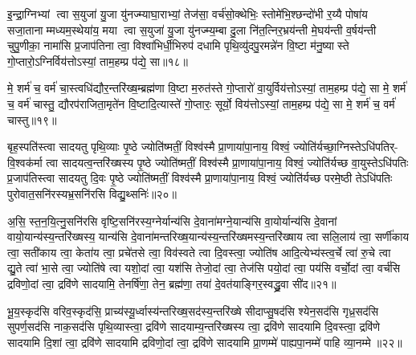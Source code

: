 {}

इ॒न्द्रा॒ग्निभ्यां त्वा स॒युजा॑ यु॒जा यु॑नज्म्याघा॒राभ्यां॒ तेज॑सा॒ वर्च॑सो॒क्थेभिः॒ स्तोमे॑भि॒श्छन्दो॑भी र॒य्यै पोषा॑य सजा॒तानाम्मध्यम॒स्थेया॑य॒ मया त्वा स॒युजा॑ यु॒जा यु॑नज्म्य॒म्बा दु॒ला नि॑त॒त्निर॒भ्रय॑न्ती मे॒घय॑न्ती व॒र्\mbox{}षय॑न्ती चुपु॒णीका॒ नामा॑सि प्र॒जाप॑तिना त्वा॒ विश्वा॑भिर्धी॒भिरुप॑ दधामि पृथि॒व्यु॑दपु॒रमन्ने॑न वि॒ष्टा म॑नु॒ष्यास्ते गो॒प्तारो॒ऽग्निर्विय॑त्तोऽस्यां॒ ताम॒हम्प्र प॑द्ये॒ सा॥१८॥

मे॒ शर्म॑ च॒ वर्म॑ चा॒स्त्वधि॑द्यौर॒न्तरि॑ख्ष॒म्ब्रह्म॑णा वि॒ष्टा म॒रुत॑स्ते गो॒प्तारो॑ वा॒युर्विय॑त्तोऽस्यां॒ ताम॒हम्प्र प॑द्ये॒ सा मे॒ शर्म॑ च॒ वर्म॑ चास्तु॒ द्यौरप॑राजिता॒मृते॑न वि॒ष्टादि॒त्यास्ते॑ गो॒प्तारः॒ सूर्यो॒ विय॑त्तोऽस्यां॒ ताम॒हम्प्र प॑द्ये॒ सा मे॒ शर्म॑ च॒ वर्म॑ चास्तु॥१९॥

{\anuvakamend[{साऽष्टाच॑त्वारिशच्च॥५॥}]}

बृह॒स्पति॑स्त्वा सादयतु पृथि॒व्याः पृ॒ष्ठे ज्योति॑ष्मतीं॒ विश्व॑स्मै प्रा॒णाया॑पा॒नाय॒ विश्वं॒ ज्योति॑र्यच्छा॒ग्निस्तेऽधि॑पतिर्- वि॒श्वक॑र्मा त्वा सादयत्व॒न्तरि॑ख्षस्य पृ॒ष्ठे ज्योति॑ष्मतीं॒ विश्व॑स्मै प्रा॒णाया॑पा॒नाय॒ विश्वं॒ ज्योति॑र्यच्छ वा॒युस्तेऽधि॑पतिः प्र॒जाप॑तिस्त्वा सादयतु दि॒वः पृ॒ष्ठे ज्योति॑ष्मतीं॒ विश्व॑स्मै प्रा॒णाया॑पा॒नाय॒ विश्वं॒ ज्योति॑र्यच्छ परमे॒ष्ठी तेऽधि॑पतिः पुरोवात॒सनि॑रस्यभ्र॒सनि॑रसि विद्यु॒थ्सनिः॑॥२०॥

अ॒सि॒ स्त॒न॒यि॒त्नु॒सनि॑रसि वृष्टि॒सनि॑रस्य॒ग्नेर्यान्य॑सि दे॒वाना॑मग्ने॒यान्य॑सि वा॒योर्यान्य॑सि दे॒वानां वायो॒यान्य॑स्य॒न्तरि॑ख्षस्य॒ यान्य॑सि दे॒वाना॑मन्तरिख्ष॒यान्य॑स्य॒न्तरि॑ख्षमस्य॒न्तरि॑ख्षाय त्वा सलि॒लाय॑ त्वा॒ सर्णी॑काय त्वा॒ सती॑काय त्वा॒ केता॑य त्वा॒ प्रचे॑तसे त्वा॒ विव॑स्वते त्वा दि॒वस्त्वा॒ ज्योति॑ष आदि॒त्येभ्य॑स्त्व॒र्चे त्वा॑ रु॒चे त्वा द्यु॒ते त्वा॑ भा॒से त्वा॒ ज्योति॑षे त्वा यशो॒दां त्वा॒ यश॑सि तेजो॒दां त्वा॒ तेज॑सि पयो॒दां त्वा॒ पय॑सि वर्चो॒दां त्वा॒ वर्च॑सि द्रविणो॒दां त्वा॒ द्रवि॑णे सादयामि॒ तेनर्\mbox{}षि॑णा॒ तेन॒ ब्रह्म॑णा॒ तया॑ दे॒वत॑याङ्गिर॒स्वद्ध्रु॒वा सी॑द॥२१॥

{\anuvakamend[{वि॒द्यु॒थ्सनि॑र्द्यु॒त्वैका॒न्नत्रि॒ꣳ॒शच्च॑॥६॥}]}

भू॒य॒स्कृद॑सि वरिव॒स्कृद॑सि॒ प्राच्य॑स्यू॒र्ध्वास्य॑न्तरिख्ष॒सद॑स्य॒न्तरि॑ख्षे सीदाप्सु॒षद॑सि श्येन॒सद॑सि गृध्र॒सद॑सि सुपर्ण॒सद॑सि नाक॒सद॑सि पृथि॒व्यास्त्वा॒ द्रवि॑णे सादयाम्य॒न्तरि॑ख्षस्य त्वा॒ द्रवि॑णे सादयामि दि॒वस्त्वा॒ द्रवि॑णे सादयामि दि॒शां त्वा॒ द्रवि॑णे सादयामि द्रविणो॒दां त्वा॒ द्रवि॑णे सादयामि प्रा॒णम्मे॑ पाह्यपा॒नम्मे॑ पाहि व्या॒नम्मे॥२२॥


